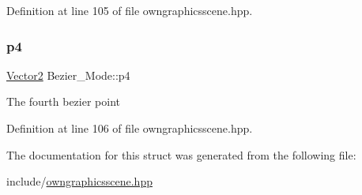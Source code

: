 Definition at line 105 of file owngraphicsscene.\+hpp.

\mbox{\label{structBezier__Mode_a5a3df46137ba62eaf3f9c0ad1ee391ef}} 
\subsubsection{\texorpdfstring{p4}{p4}}
{\footnotesize\ttfamily \mbox{\hyperlink{classVector2}{Vector2}} Bezier\+\_\+\+Mode\+::p4}

The fourth bezier point 

Definition at line 106 of file owngraphicsscene.\+hpp.



The documentation for this struct was generated from the following file\+:\begin{DoxyCompactItemize}
\item 
include/\mbox{\hyperlink{owngraphicsscene_8hpp}{owngraphicsscene.\+hpp}}\end{DoxyCompactItemize}
